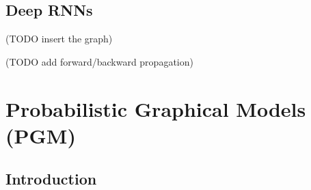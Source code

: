 \documentclass[4apaper,12pt]{book}
\begin{document}
\begin{description}
    \section{Deep RNNs}
    \begin{description}
    \item (TODO insert the graph)
    \item (TODO add forward/backward propagation)
    \end{description}
  \end{description}

  \chapter{Probabilistic Graphical Models (PGM)}
  \section{Introduction}
\end{document}
